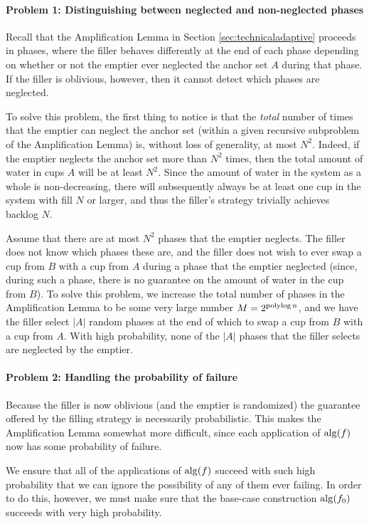 \paragraph{Problem 1: Distinguishing between neglected and non-neglected phases}
Recall that the Amplification Lemma in Section
\ref{sec:technicaladaptive} proceeds in phases, where the filler
behaves differently at the end of each phase depending on whether or
not the emptier ever neglected the anchor set $A$ during that
phase. If the filler is oblivious, however, then it cannot detect
which phases are neglected.

To solve this problem, the first thing to notice is that the
\emph{total} number of times that the emptier can neglect the anchor
set (within a given recursive subproblem of the Amplification Lemma)
is, without loss of generality, at most $N^2$. Indeed, if the emptier
neglects the anchor set more than $N^2$ times, then the total amount
of water in cups $A$ will be at least $N^2$. Since the amount of water
in the system as a whole is non-decreasing, there will subsequently
always be at least one cup in the system with fill $N$ or larger, and
thus the filler's strategy trivially achieves backlog $N$.

Assume that there are at most $N^2$ phases that the emptier
neglects. The filler does not know which phases these are, and the
filler does not wish to ever swap a cup from $B$ with a cup from $A$
during a phase that the emptier neglected (since, during such a phase,
there is no guarantee on the amount of water in the cup from $B$). To
solve this problem, we increase the total number of phases in the
Amplification Lemma to be some very large number $M = 2^{\operatorname{\text{polylog}} n}$,
and we have the filler select $|A|$ random phases at the end of which
to swap a cup from $B$ with a cup from $A$. With high probability,
none of the $|A|$ phases that the filler selects are neglected by the
emptier.

\paragraph{Problem 2: Handling the probability of failure}
Because the filler is now oblivious (and the emptier is randomized)
the guarantee offered by the filling strategy is necessarily
probabilistic. This makes the Amplification Lemma somewhat more
difficult, since each application of $\operatorname{\text{\textup{alg}}}(f)$ now has some
probability of failure.

We ensure that all of the applications of $\operatorname{\text{\textup{alg}}}(f)$ succeed with such
high probability that we can ignore the possibility of any of them
ever failing. In order to do this, however, we must make sure that the
base-case construction $\operatorname{\text{\textup{alg}}}(f_0)$ succeeds with very high
probability.

